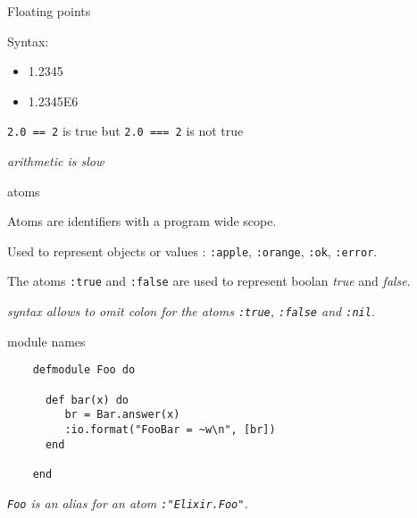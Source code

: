 \begin{frame}{Floating points}

  Syntax:
  \space{10pt}
  \begin{itemize}
  \item 1.2345 \pause
  \item 1.2345E6 \pause
  \end{itemize}

  \space{20pt}
  {\tt 2.0 == 2} is true  but {\tt 2.0 === 2} is not true

  \vspace{20pt}\pause
  {\em arithmetic is slow}  
\end{frame}

\begin{frame}{atoms}

  Atoms are identifiers with a program wide scope. \pause

  \vspace{20pt}
  Used to represent objects or values : {\tt :apple}, {\tt :orange}, {\tt :ok}, {\tt :error}. \pause

  \vspace{20pt}
  The atoms {\tt :true} and {\tt :false} are used to represent boolan {\em true} and {\em false}.\pause
  

  \vspace{20pt}
  {\em syntax allows to omit colon for the atoms {\tt :true}, {\tt :false} and {\tt :nil}.}
    
\end{frame}

\begin{frame}[fragile]{module names}

  \begin{lstlisting}
    defmodule Foo do

      def bar(x) do
         br = Bar.answer(x)
         :io.format("FooBar = ~w\n", [br])
      end

    end
  \end{lstlisting}

  \vspace{20pt}
  {\em {\tt Foo} is an alias for an atom {\tt :"Elixir.Foo"}.}
  
\end{frame}


